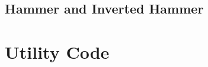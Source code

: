 \subsection{Hammer and Inverted Hammer}

\label{appA:Hammer}


\label{appA:Hammer_aroon}


\label{appA:Engulf}


\label{appA:Engulf_aroon}


\label{appA:Doji_aroon}

\section{Utility Code}
\label{appA:utility}

